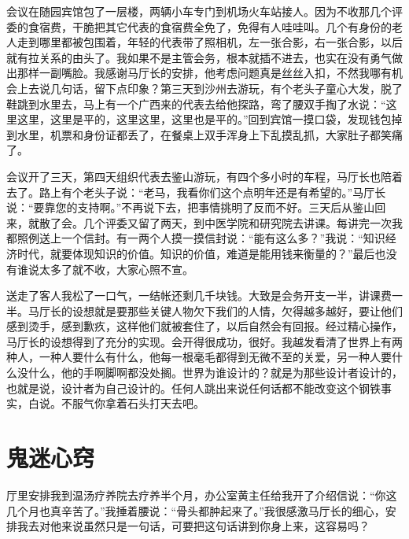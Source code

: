 \documentclass[12pt,oneside]{book}
\begin{document}
会议在随园宾馆包了一层楼，两辆小车专门到机场火车站接人。因为不收那几个评委的食宿费，干脆把其它代表的食宿费全免了，免得有人哇哇叫。几个有身份的老人走到哪里都被包围着，年轻的代表带了照相机，左一张合影，右一张合影，以后就有拉关系的由头了。我如果不是主管会务，根本就插不进去，也实在没有勇气做出那样一副嘴脸。我感谢马厅长的安排，他考虑问题真是丝丝入扣，不然我哪有机会上去说几句话，留下点印象？第三天到沙州去游玩，有个老头子童心大发，脱了鞋跳到水里去，马上有一个广西来的代表去给他探路，弯了腰双手掏了水说：``这里这里，这里是平的，这里这里，这里也是平的。''回到宾馆一摸口袋，发现钱包掉到水里，机票和身份证都丢了，在餐桌上双手浑身上下乱摸乱抓，大家肚子都笑痛了。

会议开了三天，第四天组织代表去鉴山游玩，有四个多小时的车程，马厅长也陪着去了。路上有个老头子说：``老马，我看你们这个点明年还是有希望的。''马厅长说：``要靠您的支持啊。''不再说下去，把事情挑明了反而不好。三天后从鉴山回来，就散了会。几个评委又留了两天，到中医学院和研究院去讲课。每讲完一次我都照例送上一个信封。有一两个人摸一摸信封说：``能有这么多？''我说：``知识经济时代，就要体现知识的价值。知识的价值，难道是能用钱来衡量的？''最后也没有谁说太多了就不收，大家心照不宣。

送走了客人我松了一口气，一结帐还剩几千块钱。大致是会务开支一半，讲课费一半。马厅长的设想就是要那些关键人物欠下我们的人情，欠得越多越好，要让他们感到烫手，感到歉疚，这样他们就被套住了，以后自然会有回报。经过精心操作，马厅长的设想得到了充分的实现。会开得很成功，很好。我越发看清了世界上有两种人，一种人要什么有什么，他每一根毫毛都得到无微不至的关爱，另一种人要什么没什么，他的手啊脚啊都没处搁。世界为谁设计的？就是为那些设计者设计的，也就是说，设计者为自己设计的。任何人跳出来说任何话都不能改变这个钢铁事实，白说。不服气你拿着石头打天去吧。


\chapter{鬼迷心窍}

厅里安排我到温汤疗养院去疗养半个月，办公室黄主任给我开了介绍信说：``你这几个月也真辛苦了。''我捶着腰说：``骨头都肿起来了。''我很感激马厅长的细心，安排我去对他来说虽然只是一句话，可要把这句话讲到你身上来，这容易吗？
\end{document}
